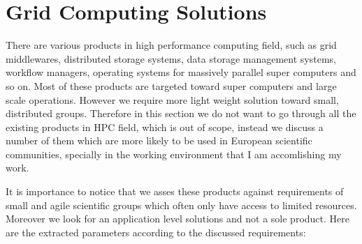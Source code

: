 

\section{Grid Computing Solutions}
There are various products in high performance computing field, such as grid middlewares, distributed
storage systems, data storage management systems, workflow managers, operating systems for massively parallel 
super computers and so on. Most of these products are targeted toward super computers and large scale
operations. However we require more light weight solution toward small, distributed groups. 
Therefore in this section we do not want to go through
all the existing products in HPC field, which is out of scope, instead we discuss a number of them
which are more likely to be used in European scientific communities, specially in the working 
environment that I am accomlishing my work.

It is importance to notice that we asses these products against 
requirements of small and agile scientific groups which often only have access to limited resources.
Moreover we look for an application level solutions and not a sole product.
Here are the extracted parameters according to the discussed requirements:


